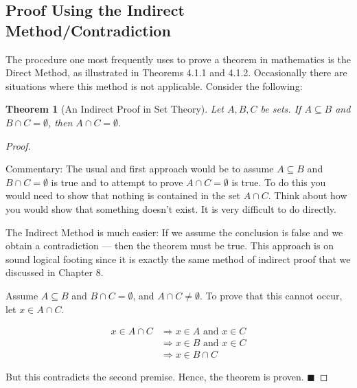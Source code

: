 \documentclass[10pt,]{book}
\theoremstyle{plain}
\newtheorem{theorem}{Theorem}[section]
\theoremstyle{definition}
\theoremstyle{definition}
\theoremstyle{definition}
\begin{document}
\subsection[Proof Using the Indirect Method/Contradiction]{Proof Using the Indirect Method/Contradiction}\label{ss-proof-sets-contradiction}
The procedure one most frequently uses to prove a theorem in mathematics is the Direct Method, as illustrated in Theorems 4.1.1 and 4.1.2. Occasionally there are situations where this method is not applicable. Consider the following:%
\begin{theorem}[An Indirect Proof in Set Theory]\label{theorem-example-sets-contradiction}
Let \(A, B, C\) be sets. If \(A\subseteq B\) and \(B\cap C = \emptyset\), then \(A\cap C = \emptyset\).%
\end{theorem}
\begin{proof}\hypertarget{proof-4}{}
Commentary: The usual and first approach would be to assume \(A\subseteq B\) and \(B\cap C = \emptyset\) is true and to attempt to prove \(A\cap C = \emptyset\) is true. To do this you would need to show that nothing is contained in the set \(A \cap  C\). Think about how you would show that something doesn't exist. It is very difficult to do directly.%
\par
The Indirect Method is much easier: If we assume the conclusion is false and we obtain a contradiction ---  then the theorem must be true. This approach is on sound logical footing since it is exactly the same method of indirect proof that we discussed in Chapter 8.%
\par
Assume \(A\subseteq B\) and \(B\cap C = \emptyset\), and \(A\cap C \neq  \emptyset\). To prove that this cannot
occur, let \(x\in A \cap C\).%
\par
\begin{equation*}
\begin{split}
x \in A \cap C & \Rightarrow x \in A \textrm{ and } x \in  C\\
	& \Rightarrow x \in B \textrm{ and } x \in  C\\
	& \Rightarrow x \in  B \cap C
\end{split}
\end{equation*}%
\par
But this contradicts the second premise.  Hence, the theorem is proven. \(\blacksquare \) %
\end{proof}
\typeout{************************************************}
\typeout{************************************************}
\end{document}
